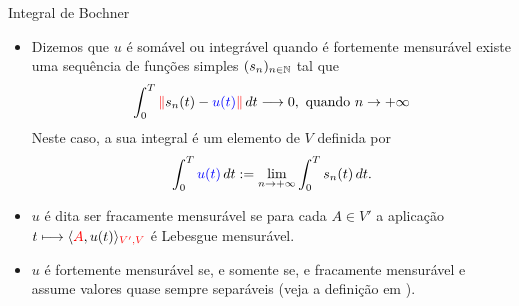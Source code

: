 \begin{frame}{Integral de Bochner}
\begin{itemize}
\item Dizemos que {\color{blue}\(u\)} é  {\color{blue} somável ou integrável} quando é 
{\color{blue}fortemente mensurável}   existe uma sequência de funções simples \((s_n)_{n\in \mathbb{N}}\)  tal que 
\[
\int_0^T \nr{s_n(t)-{\color{blue}u(t)}}\,dt \longrightarrow 0, \text{ quando } n\to +\infty
\]
 Neste caso, a sua integral é um elemento de {\color{red}\(V\)} definida por
\[\int_0^T {\color{blue}u(t)}\,dt:=\lim\limits_{n\to+\infty} \int_0^T s_n(t)\,dt.\]

\item  {\color{blue}\(u\)} é dita ser {\color{blue}fracamente mensurável} se para cada {\color{red}\(A\in V'\)} a aplicação \(t\longmapsto \langle{\color{red}A},u(t)\rangle_{{\color{red}V',V}}\) é Lebesgue mensurável.


\item {\color{blue}\(u\)} é fortemente mensurável se, e somente se, e fracamente 
mensurável e assume valores quase sempre separáveis (veja a definição em 
{\color{blue}\cite{evans}}).

\end{itemize}
\end{frame}
